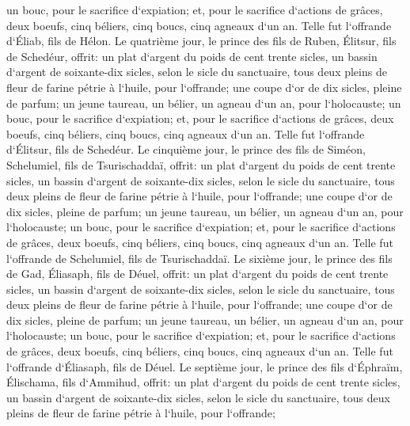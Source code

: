 \verse un bouc, pour le sacrifice d`expiation; 
\verse et, pour le sacrifice d`actions de grâces, deux boeufs, cinq béliers, cinq boucs, cinq agneaux d`un an. Telle fut l`offrande d`Éliab, fils de Hélon. 
\verse Le quatrième jour, le prince des fils de Ruben, Élitsur, fils de Schedéur, 
\verse offrit: un plat d`argent du poids de cent trente sicles, un bassin d`argent de soixante-dix sicles, selon le sicle du sanctuaire, tous deux pleins de fleur de farine pétrie à l`huile, pour l`offrande; 
\verse une coupe d`or de dix sicles, pleine de parfum; 
\verse un jeune taureau, un bélier, un agneau d`un an, pour l`holocauste; 
\verse un bouc, pour le sacrifice d`expiation; 
\verse et, pour le sacrifice d`actions de grâces, deux boeufs, cinq béliers, cinq boucs, cinq agneaux d`un an. Telle fut l`offrande d`Élitsur, fils de Schedéur. 
\verse Le cinquième jour, le prince des fils de Siméon, Schelumiel, fils de Tsurischaddaï, 
\verse offrit: un plat d`argent du poids de cent trente sicles, un bassin d`argent de soixante-dix sicles, selon le sicle du sanctuaire, tous deux pleins de fleur de farine pétrie à l`huile, pour l`offrande; 
\verse une coupe d`or de dix sicles, pleine de parfum; 
\verse un jeune taureau, un bélier, un agneau d`un an, pour l`holocauste; 
\verse un bouc, pour le sacrifice d`expiation; 
\verse et, pour le sacrifice d`actions de grâces, deux boeufs, cinq béliers, cinq boucs, cinq agneaux d`un an. Telle fut l`offrande de Schelumiel, fils de Tsurischaddaï. 
\verse Le sixième jour, le prince des fils de Gad, Éliasaph, fils de Déuel, 
\verse offrit: un plat d`argent du poids de cent trente sicles, un bassin d`argent de soixante-dix sicles, selon le sicle du sanctuaire, tous deux pleins de fleur de farine pétrie à l`huile, pour l`offrande; 
\verse une coupe d`or de dix sicles, pleine de parfum; 
\verse un jeune taureau, un bélier, un agneau d`un an, pour l`holocauste; 
\verse un bouc, pour le sacrifice d`expiation; 
\verse et, pour le sacrifice d`actions de grâces, deux boeufs, cinq béliers, cinq boucs, cinq agneaux d`un an. Telle fut l`offrande d`Éliasaph, fils de Déuel. 
\verse Le septième jour, le prince des fils d`Éphraïm, Élischama, fils d`Ammihud, 
\verse offrit: un plat d`argent du poids de cent trente sicles, un bassin d`argent de soixante-dix sicles, selon le sicle du sanctuaire, tous deux pleins de fleur de farine pétrie à l`huile, pour l`offrande; 
